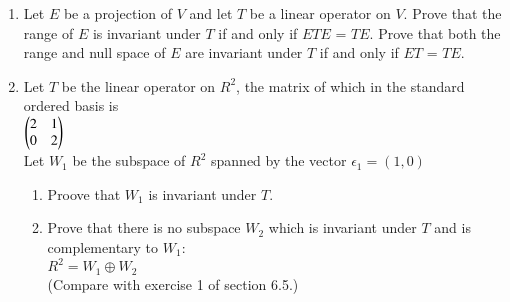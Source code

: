 \renewcommand{\theequation}{\theenumi}
\renewcommand{\thefigure}{\theenumi}
\begin{enumerate}[label=\thesubsection.\arabic*.,ref=\thesubsection.\theenumi]

\item Let $E$ be a projection of $V$ and let $T$ be a linear operator on $V$. Prove that the range of $E$ is invariant under $T$ if and only if $ETE$ = $TE$. Prove that both the range and null space of $E$ are invariant under $T$ if and only if $ET$ = $TE$. 
%
\\
\solution

\item Let $T$ be the linear operator on $R^2$, the matrix of which in the standard ordered basis is \\
$\begin{pmatrix}2&1\\0&2\end{pmatrix}$\\
Let $W_1$ be the subspace of $R^2$ spanned by the vector $\epsilon_1=(1,0)$
\begin{enumerate}
\item Proove that $W_1$ is invariant under $T$.
\item Prove that there is no subspace $W_2$ which is invariant under $T$ and is complementary to $W_1$:\\
$R^2=W_1\oplus W_2$\\
(Compare with exercise 1 of section 6.5.)
\end{enumerate}
%
\solution

\end{enumerate}
